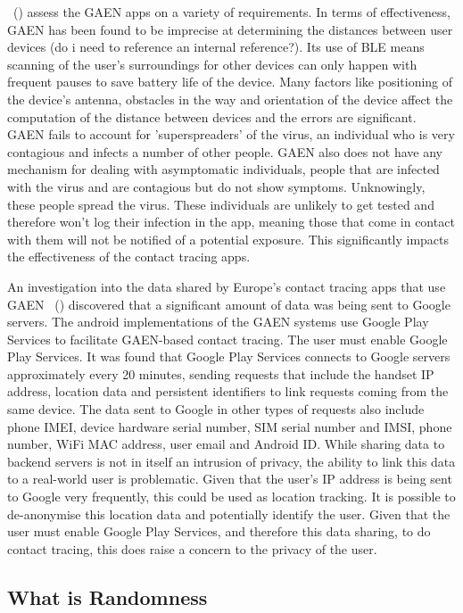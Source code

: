 ~(\cite{9931613})  assess the GAEN apps on a variety of requirements. In terms of effectiveness, GAEN has been found to be imprecise at determining the distances between user devices (do i need to reference an internal reference?). Its use of BLE means scanning of the user's surroundings for other devices can only happen with frequent pauses to save battery life of the device. Many factors like positioning of the device's antenna, obstacles in the way and orientation of the device affect the computation of the distance between devices and the errors are significant. GAEN fails to account for 'superspreaders' of the virus, an individual who is very contagious and infects a number of other people. GAEN also does not have any mechanism for dealing with asymptomatic individuals, people that are infected with the virus and are contagious but do not show symptoms. Unknowingly, these people spread the virus. These individuals are unlikely to get tested and therefore won't log their infection in the app, meaning those that come in contact with them will not be notified of a potential exposure. This significantly impacts the effectiveness of the contact tracing apps. \par
An investigation into the data shared by Europe's contact tracing apps that use GAEN ~(\cite{9488728}) discovered that a significant amount of data was being sent to Google servers. The android implementations of the GAEN systems use Google Play Services to facilitate GAEN-based contact tracing. The user must enable Google Play Services. It was found that Google Play Services connects to Google servers approximately every 20 minutes, sending requests that include the handset IP address, location data and persistent identifiers to link requests coming from the same device. The data sent to Google in other types of requests also include phone IMEI, device hardware serial number, SIM serial number and IMSI, phone number, WiFi MAC address, user email and Android ID. While sharing data to backend servers is not in itself an intrusion of privacy, the ability to link this data to a real-world user is problematic. Given that the user's IP address is being sent to Google very frequently, this could be used as location tracking. It is possible to de-anonymise this location data and potentially identify the user. Given that the user must enable Google Play Services, and therefore this data sharing, to do contact tracing, this does raise a concern to the privacy of the user. \par


\subsection{What is Randomness}

